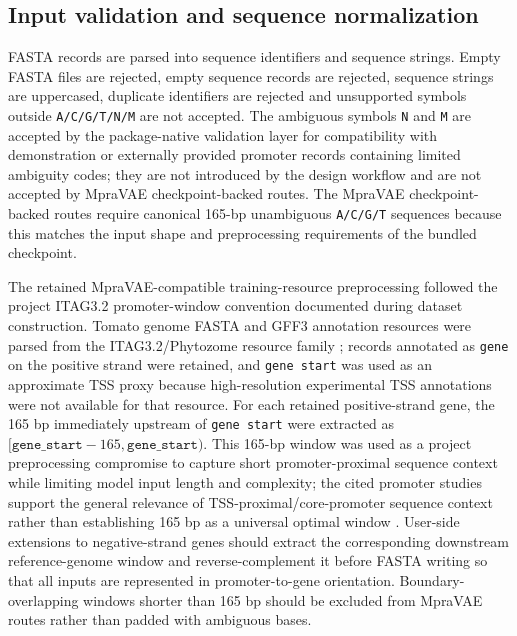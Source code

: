 \documentclass[10pt]{article}
\begin{document}
\subsection{Input validation and sequence normalization}

FASTA records are parsed into sequence identifiers and sequence strings. Empty FASTA files are rejected, empty sequence records are rejected, sequence strings are uppercased, duplicate identifiers are rejected and unsupported symbols outside \texttt{A/C/G/T/N/M} are not accepted. The ambiguous symbols \texttt{N} and \texttt{M} are accepted by the package-native validation layer for compatibility with demonstration or externally provided promoter records containing limited ambiguity codes; they are not introduced by the design workflow and are not accepted by MpraVAE checkpoint-backed routes. The MpraVAE checkpoint-backed routes require canonical 165-bp unambiguous \texttt{A/C/G/T} sequences because this matches the input shape and preprocessing requirements of the bundled checkpoint.

The retained MpraVAE-compatible training-resource preprocessing followed the project ITAG3.2 promoter-window convention documented during dataset construction. Tomato genome FASTA and GFF3 annotation resources were parsed from the ITAG3.2/Phytozome resource family \cite{Goodstein2012,Sato2012}; records annotated as \texttt{gene} on the positive strand were retained, and \texttt{gene start} was used as an approximate TSS proxy because high-resolution experimental TSS annotations were not available for that resource. For each retained positive-strand gene, the 165 bp immediately upstream of \texttt{gene start} were extracted as \([\texttt{gene\_start}-165,\texttt{gene\_start})\). This 165-bp window was used as a project preprocessing compromise to capture short promoter-proximal sequence context while limiting model input length and complexity; the cited promoter studies support the general relevance of TSS-proximal/core-promoter sequence context rather than establishing 165 bp as a universal optimal window \cite{Danino2015,Jores2021}. User-side extensions to negative-strand genes should extract the corresponding downstream reference-genome window and reverse-complement it before FASTA writing so that all inputs are represented in promoter-to-gene orientation. Boundary-overlapping windows shorter than 165 bp should be excluded from MpraVAE routes rather than padded with ambiguous bases.
\end{document}
